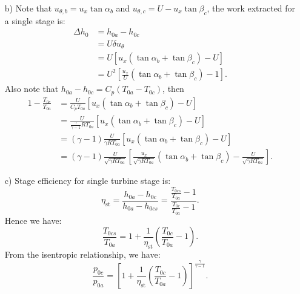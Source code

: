 \documentclass[12pt]{article}
\begin{document}
\begin{itemize}
	\item[b)]
	Note that $u_{\theta,b} = u_x \tan \alpha_b$ and $u_{\theta,c} = U - u_x \tan \beta_c$, the work extracted for a single stage is:
	\begin{align}
		\Delta h_0 &= h_{0a} - h_{0c} \nonumber \\
				   &= U\delta u_{\theta} \nonumber \\
				   &= U \left[ u_x \left(\tan \alpha_b + \tan \beta_c\right) - U\right] \nonumber \\
				   &= U^2 \left[ \frac{u_x}{U} \left(\tan \alpha_b + \tan \beta_c\right) - 1\right].
	\end{align}
	Also note that $h_{0a} - h_{0c} = C_p\left(T_{0a}-T_{0c}\right)$, then
	\begin{align}
		1 - \frac{T_{0c}}{T_{0a}} &= \frac{U}{C_p T_{0a}} \left[ u_x \left(\tan \alpha_b + \tan \beta_c\right) - U\right] \nonumber \\
								  &= \frac{U}{\frac{\gamma}{\gamma - 1}R T_{0a}} \left[ u_x \left(\tan \alpha_b + \tan \beta_c\right) - U\right] \nonumber \\
								  &= \left(\gamma - 1\right)\frac{U}{\gamma R T_{0a}} \left[ u_x \left(\tan \alpha_b + \tan \beta_c\right) - U\right] \nonumber \\
								  &= \left(\gamma - 1\right)\frac{U}{\sqrt{\gamma R T_{0a}}} \left[ \frac{u_x}{\sqrt{\gamma R T_{0a}}} \left(\tan \alpha_b + \tan \beta_c\right) - \frac{U}{\sqrt{\gamma R T_{0a}}}\right].
	\end{align}
	
	\item[c)]
	Stage efficiency for single turbine stage is:
	\begin{equation}
		\eta_\text{st} = \frac{h_{0a} - h_{0c}}{h_{0a} - h_{0cs}} = \frac{\frac{T_{0cs}}{T_{0a}}-1}{\frac{T_{0c}}{T_{0a}}-1}.
	\end{equation}
	Hence we have:
	\begin{equation}
		\frac{T_{0cs}}{T_{0a}} = 1 + \frac{1}{\eta_\text{st}}\left( \frac{T_{0c}}{T_{0a}}-1\right).
	\end{equation}
	From the isentropic relationship, we have:
	\begin{equation}
		\frac{p_{0c}}{p_{0a}} = \left[1 + \frac{1}{\eta_\text{st}}\left( \frac{T_{0c}}{T_{0a}}-1\right)\right]^{\frac{\gamma}{\gamma - 1}}.
	\end{equation}
	

\end{itemize}
\end{document}
